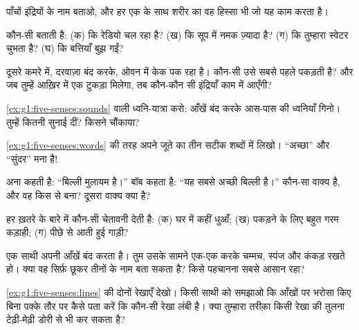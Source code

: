 \begin{exercise}[$\star$]\label{exo:g1:five-senses:1}
पाँचों इंद्रियों के नाम बताओ, और हर एक के साथ शरीर का वह हिस्सा भी
जो यह काम करता है।
\end{exercise}

\begin{exercise}[$\star$]\label{exo:g1:five-senses:2}
कौन-सी  बताती है: (क) कि रेडियो चल रहा है? (ख) कि सूप में
नमक ज़्यादा है? (ग) कि तुम्हारा स्वेटर चुभता है? (घ) कि बत्तियाँ बुझ
गईं?
\end{exercise}

\begin{exercise}[$\star$]\label{exo:g1:five-senses:3}
दूसरे कमरे में, दरवाज़ा बंद करके, ओवन में केक पक रहा है। कौन-सी
 उसे सबसे पहले पकड़ती है? और जब तुम्हें आख़िर में एक टुकड़ा
मिलेगा, तब कौन-कौन सी इंद्रियाँ काम में आएँगी?
\end{exercise}

\begin{exercise}[$\star$]\label{exo:g1:five-senses:4}
\cref{ex:g1:five-senses:sounds} वाली ध्वनि-यात्रा करो: आँखें बंद
करके आस-पास की ध्वनियाँ गिनो। तुम्हें कितनी सुनाई दीं? किसने चौंकाया?
\end{exercise}

\begin{exercise}[$\star$]\label{exo:g1:five-senses:5}
\cref{ex:g1:five-senses:words} की तरह अपने जूते का  तीन सटीक
शब्दों में लिखो। ``अच्छा'' और ``सुंदर'' मना है!
\end{exercise}

\begin{exercise}[$\star$]\label{exo:g1:five-senses:6}
अना कहती है: ``बिल्ली मुलायम है।'' बॉब कहता है: ``यह सबसे अच्छी
बिल्ली है।'' कौन-सा वाक्य  है, और वह किस  से बना? दूसरा
वाक्य क्या है?
\end{exercise}

\begin{exercise}[$\star$]\label{exo:g1:five-senses:7}
हर ख़तरे के बारे में कौन-सी  चेतावनी देती है: (क) घर में कहीं
धुआँ; (ख) पकड़ने के लिए बहुत गरम कड़ाही; (ग) पीछे से आती हुई गाड़ी?
\end{exercise}

\begin{exercise}[$\star$]\label{exo:g1:five-senses:8}
एक साथी अपनी आँखें बंद करता है। तुम उसके सामने एक-एक करके चम्मच,
स्पंज और कंकड़ रखते हो। क्या वह सिर्फ़ छूकर तीनों के नाम बता सकता है?
किसे पहचानना सबसे आसान रहा?
\end{exercise}

\begin{exercise}[$\star\star$]\label{exo:g1:five-senses:9}
\cref{ex:g1:five-senses:lines} की दोनों रेखाएँ देखो। किसी साथी को
समझाओ कि आँखों पर भरोसा किए बिना पक्के तौर पर कैसे पता करें कि कौन-सी
रेखा लंबी है। क्या तुम्हारा तरीक़ा किसी रेखा की तुलना टेढ़ी-मेढ़ी डोरी
से भी कर सकता है?
\end{exercise}
